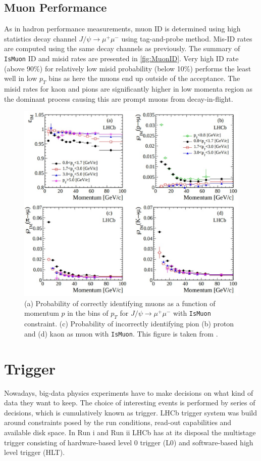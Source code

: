 \subsection{Muon Performance}
As in hadron performance measurements, muon ID is determined using high statistics decay channel $J/\psi \rightarrow \mu^{+} \mu^{-}$ using tag-and-probe method. Mis-ID rates are computed using the same decay channels as previously. The summary of \texttt{IsMuon} \Gls{ID} and misid rates are presented in \autoref{fig:MuonID}. Very high ID rate (above 90\%) for relatively low misid probability (below 10\%) performs the least well in low $p_{T}$ bins as here the muons end up outside of the acceptance. The misid rates for kaon and pions are significantly higher in low momenta region as the dominant process causing this are prompt muons from decay-in-flight.   

\begin{figure}[!h]
	\includegraphics[width = 1.0\textwidth]{figs/detector/MuonPIDIsMuon.eps}%
	\caption{(a) Probability of correctly identifying muons as a function of momentum $p$ in the bins of $p_{T}$ for $J/\psi \rightarrow \mu^{+} \mu^{-}$ with \texttt{IsMuon} constraint. (c) Probability of incorrectly identifying pion (b) proton and (d) kaon as muon with \texttt{IsMuon}. This figure is taken from \cite{LHCb-DP-2013-001}. }  
	\label{fig:MuonID}
\end{figure}


\section{Trigger}
Nowadays, big-data physics experiments have to make decisions on what kind of data they want to keep. The choice of interesting events is performed by series of decisions, which is cumulatively known as trigger. \Gls{LHCb} trigger system was build around constraints posed by the run conditions, read-out capabilities and available disk space. In Run \Rn{1} and Run \Rn{2} LHCb has at its disposal the multistage trigger consisting of hardware-based level 0 trigger (\Gls{L0}) and software-based high level trigger (\Gls{HLT}).

